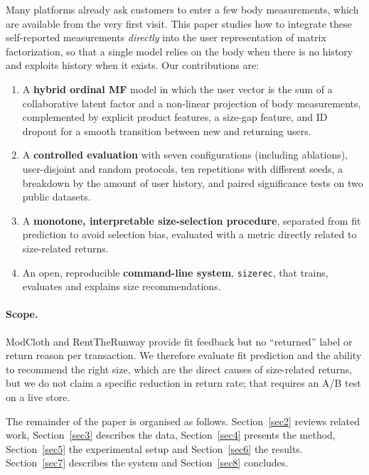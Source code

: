 \documentclass[pdflatex,sn-mathphys-num]{sn-jnl}
\begin{document}
Many platforms already ask customers to enter a few body measurements, which are available from the very first visit. This paper studies how to integrate these self-reported measurements \emph{directly} into the user representation of matrix factorization, so that a single model relies on the body when there is no history and exploits history when it exists. Our contributions are:
\begin{enumerate}
\item A \textbf{hybrid ordinal MF} model in which the user vector is the sum of a collaborative latent factor and a non-linear projection of body measurements, complemented by explicit product features, a size-gap feature, and ID dropout for a smooth transition between new and returning users.
\item A \textbf{controlled evaluation} with seven configurations (including ablations), user-disjoint and random protocols, ten repetitions with different seeds, a breakdown by the amount of user history, and paired significance tests on two public datasets.
\item A \textbf{monotone, interpretable size-selection procedure}, separated from fit prediction to avoid selection bias, evaluated with a metric directly related to size-related returns.
\item An open, reproducible \textbf{command-line system}, \texttt{sizerec}, that trains, evaluates and explains size recommendations.
\end{enumerate}

\paragraph{Scope.} ModCloth and RentTheRunway provide fit feedback but no ``returned'' label or return reason per transaction. We therefore evaluate fit prediction and the ability to recommend the right size, which are the direct causes of size-related returns, but we do not claim a specific reduction in return rate; that requires an A/B test on a live store.

The remainder of the paper is organised as follows. Section~\ref{sec2} reviews related work, Section~\ref{sec3} describes the data, Section~\ref{sec4} presents the method, Section~\ref{sec5} the experimental setup and Section~\ref{sec6} the results. Section~\ref{sec7} describes the system and Section~\ref{sec8} concludes.



\backmatter
\end{document}
